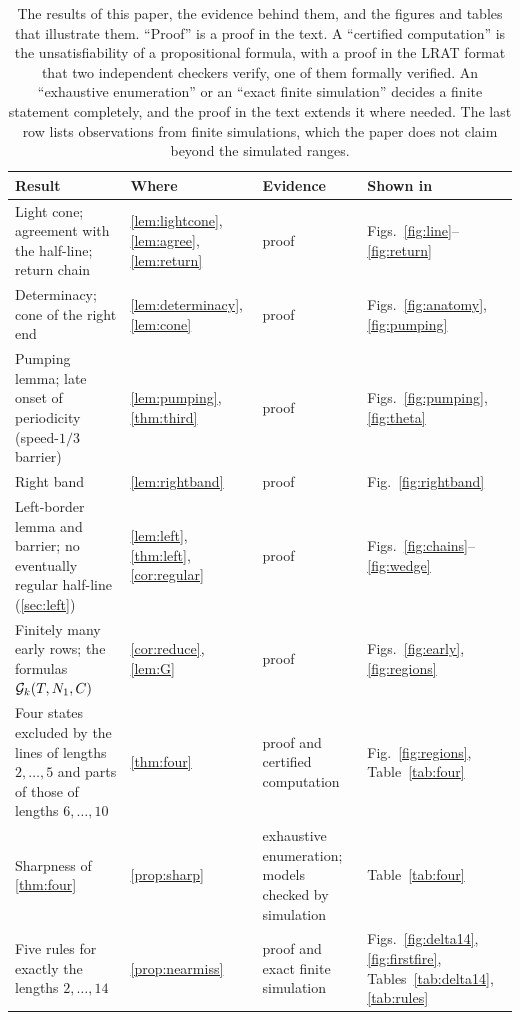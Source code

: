 \begin{table}[tbp]
\centering\small
\caption{The results of this paper, the evidence behind them, and the figures
and tables that illustrate them. ``Proof'' is a proof in the text. A
``certified computation'' is the unsatisfiability of a propositional formula,
with a proof in the LRAT format that two independent checkers verify, one of
them formally verified. An
``exhaustive enumeration'' or an ``exact finite simulation'' decides a finite
statement completely, and the proof in the text extends it where needed. The
last row lists observations from finite simulations, which the paper does not
claim beyond the simulated ranges.}
\label{tab:results}
\begin{tabular}{@{}>{\raggedright\arraybackslash}p{}l>{\raggedright\arraybackslash}p{}>{\raggedright\arraybackslash}p{}@{}}
\toprule
Result & Where & Evidence & Shown in\\
\midrule
Light cone; agreement with the half-line; return chain & \ref{lem:lightcone}, \ref{lem:agree}, \ref{lem:return} & proof & Figs.~\ref{fig:line}--\ref{fig:return}\\
Determinacy; cone of the right end & \ref{lem:determinacy}, \ref{lem:cone} & proof & Figs.~\ref{fig:anatomy}, \ref{fig:pumping}\\
Pumping lemma; late onset of periodicity (speed-$1/3$ barrier) & \ref{lem:pumping}, \ref{thm:third} & proof & Figs.~\ref{fig:pumping}, \ref{fig:theta}\\
Right band & \ref{lem:rightband} & proof & Fig.~\ref{fig:rightband}\\
Left-border lemma and barrier; no eventually regular half-line (\cref{sec:left}) & \ref{lem:left}, \ref{thm:left}, \ref{cor:regular} & proof & Figs.~\ref{fig:chains}--\ref{fig:wedge}\\
Finitely many early rows; the formulas $\mathcal G_k(T,N_1,C)$ & \ref{cor:reduce}, \ref{lem:G} & proof & Figs.~\ref{fig:early}, \ref{fig:regions}\\
Four states excluded by the lines of lengths $2,\dots,5$ and parts of those of lengths $6,\dots,10$ & \ref{thm:four} & proof and certified computation & Fig.~\ref{fig:regions}, Table~\ref{tab:four}\\
Sharpness of \cref{thm:four} & \ref{prop:sharp} & exhaustive enumeration; models checked by simulation & Table~\ref{tab:four}\\
Five rules for exactly the lengths $2,\dots,14$ & \ref{prop:nearmiss} & proof and exact finite simulation & Figs.~\ref{fig:delta14}, \ref{fig:firstfire}, Tables~\ref{tab:delta14}, \ref{tab:rules}\\

\end{tabular}
\end{table}
